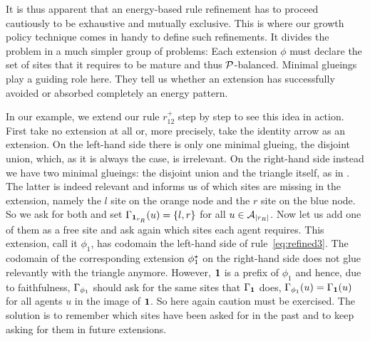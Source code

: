 It is thus apparent that
an energy-based rule refinement has to proceed
cautiously to be exhaustive and mutually exclusive. %
This is where our growth policy technique
comes in handy to define such refinements.
It divides the problem in a much simpler group of problems:
Each extension $\phi$ must declare the set of sites
that it requires to be mature and thus $\mathcal{P}$-balanced.
Minimal glueings play a guiding role here.
They tell us whether an extension has successfully
avoided or absorbed completely an energy pattern.

In our example, we extend our rule $r^+_{12}$
step by step to see this idea in action.
First take no extension at all or,
more precisely, take the identity arrow as an extension.
On the left-hand side there is only one minimal glueing,
the disjoint union, which, as it is always the case,
is irrelevant.
On the right-hand side instead we have two minimal glueings:
the disjoint union and the triangle itself,
as in .
The latter is indeed relevant and informs us
of which sites are missing in the extension,
namely the $l$ site on the orange node
and the $r$ site on the blue node.
So we ask for both and set $\Gamma_{\boldsymbol{\mathbf{1}}_{r_R}}(u) = \left\{ l,r \right\}$
for all $u \in \mathcal{A}_{\left|r_R\right|}$.
Now let us add one of them as a free site
and ask again which sites each agent requires.
This extension, call it $\phi_1$, has codomain
the left-hand side of rule~\ref{eq:refined3}.
The codomain of the corresponding extension $\phi_1^\star$
on the right-hand side
does not glue relevantly with the triangle anymore.
However, $\boldsymbol{\mathbf{1}}$ is a prefix of $\phi_1$
and hence, due to faithfulness,
$\Gamma_{\phi_1}$ should ask for the same sites
that $\Gamma_{\boldsymbol{\mathbf{1}}}$ does,
\ie $\Gamma_{\phi_1}(u) = \Gamma_{\boldsymbol{\mathbf{1}}}(u)$
for all agents $u$ in the image of $\boldsymbol{\mathbf{1}}$. %
So here again caution must be exercised.
The solution is to remember which sites have been asked for
in the past and to keep asking for them in future extensions.

